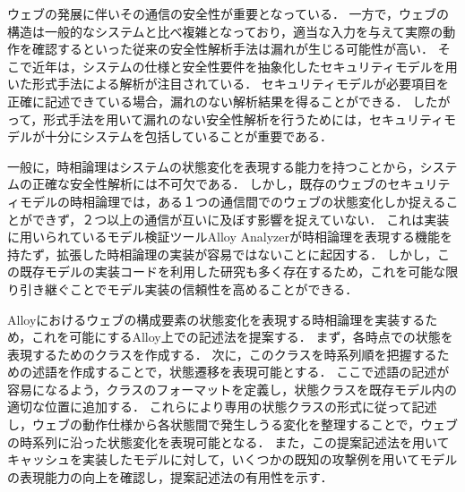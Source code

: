 \documentclass[12pt,a4paper]{jbook}
\begin{document}
ウェブの発展に伴いその通信の安全性が重要となっている．
一方で，ウェブの構造は一般的なシステムと比べ複雑となっており，適当な入力を与えて実際の動作を確認するといった従来の安全性解析手法は漏れが生じる可能性が高い．
そこで近年は，システムの仕様と安全性要件を抽象化したセキュリティモデルを用いた形式手法による解析が注目されている．
セキュリティモデルが必要項目を正確に記述できている場合，漏れのない解析結果を得ることができる．
したがって，形式手法を用いて漏れのない安全性解析を行うためには，セキュリティモデルが十分にシステムを包括していることが重要である．

一般に，時相論理はシステムの状態変化を表現する能力を持つことから，システムの正確な安全性解析には不可欠である．
しかし，既存のウェブのセキュリティモデルの時相論理では，ある１つの通信間でのウェブの状態変化しか捉えることができず，２つ以上の通信が互いに及ぼす影響を捉えていない．
これは実装に用いられているモデル検証ツールAlloy Analyzerが時相論理を表現する機能を持たず，拡張した時相論理の実装が容易ではないことに起因する．
しかし，この既存モデルの実装コードを利用した研究も多く存在するため，これを可能な限り引き継ぐことでモデル実装の信頼性を高めることができる．

Alloyにおけるウェブの構成要素の状態変化を表現する時相論理を実装するため，これを可能にするAlloy上での記述法を提案する．
まず，各時点での状態を表現するためのクラスを作成する．
次に，このクラスを時系列順を把握するための述語を作成することで，状態遷移を表現可能とする．
ここで述語の記述が容易になるよう，クラスのフォーマットを定義し，状態クラスを既存モデル内の適切な位置に追加する．
これらにより専用の状態クラスの形式に従って記述し，ウェブの動作仕様から各状態間で発生しうる変化を整理することで，ウェブの時系列に沿った状態変化を表現可能となる．
また，この提案記述法を用いてキャッシュを実装したモデルに対して，いくつかの既知の攻撃例を用いてモデルの表現能力の向上を確認し，提案記述法の有用性を示す．
\end{document}
